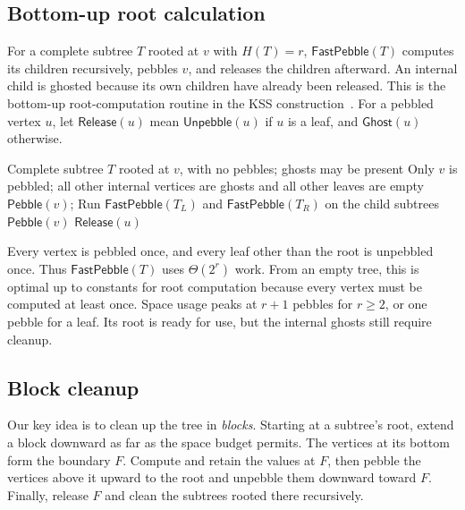 \documentclass[11pt]{article}
\theoremstyle{definition}
\theoremstyle{remark}
\newcommand{\Peb}{\mathsf{Pebble}}
\newcommand{\Unp}{\mathsf{Unpebble}}
\newcommand{\Ghost}{\mathsf{Ghost}}
\newcommand{\Fast}{\mathsf{FastPebble}}
\newcommand{\Release}{\mathsf{Release}}
\begin{document}
\subsection{Bottom-up root calculation}
\label{sec:fast-root}

For a complete subtree $T$ rooted at $v$ with $H(T)=r$, $\Fast(T)$ computes its children recursively, pebbles $v$, and releases the children afterward. An internal child is ghosted because its own children have already been released. This is the bottom-up root-computation routine in the KSS construction~\cite[Theorem~5.5]{KSS2025}. For a pebbled vertex $u$, let $\Release(u)$ mean $\Unp(u)$ if $u$ is a leaf, and $\Ghost(u)$ otherwise.

\begin{algorithm}[H]
\caption{Bottom-up root computation $\Fast(T)$}
\label{alg:fast-root}
\begin{algorithmic}[1]
\Require Complete subtree $T$ rooted at $v$, with no pebbles; ghosts may be present
\Ensure Only $v$ is pebbled; all other internal vertices are ghosts and all other leaves are empty
 \State $\Peb(v)$; \Return
\EndIf
\State Run $\Fast(T_L)$ and $\Fast(T_R)$ on the child subtrees
\State $\Peb(v)$
\State $\Release(u)$
\EndFor
\end{algorithmic}
\end{algorithm}

Every vertex is pebbled once, and every leaf other than the root is unpebbled once. Thus $\Fast(T)$ uses $\Theta(2^r)$ work. From an empty tree, this is optimal up to constants for root computation because every vertex must be computed at least once. Space usage peaks at $r+1$ pebbles for $r\ge2$, or one pebble for a leaf. Its root is ready for use, but the internal ghosts still require cleanup.

\subsection{Block cleanup}
\label{sec:block-cleanup}

Our key idea is to clean up the tree in \emph{blocks}. Starting at a subtree's root, extend a block downward as far as the space budget permits. The vertices at its bottom form the boundary $F$. Compute and retain the values at $F$, then pebble the vertices above it upward to the root and unpebble them downward toward $F$. Finally, release $F$ and clean the subtrees rooted there recursively.
\end{document}
